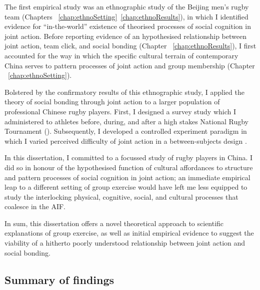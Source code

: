 The first empirical study was an ethnographic study of the Beijing men's rugby team (Chapters ~\ref{chap:ethnoSetting}\nobreakdash~\ref{chap:ethnoResults}), in which I identified evidence for ``in-the-world'' existence of
theorised processes of social cognition in joint action.  Before reporting evidence of an hypothesised relationship between joint action, team click, and social bonding (Chapter ~\ref{chap:ethnoResults}), I first accounted for the way in which the specific cultural terrain of contemporary China serves to pattern processes of joint action and group membership (Chapter ~\ref{chap:ethnoSetting}).

Bolstered by the confirmatory results of this ethnographic study, I applied the theory of social bonding through joint action to a larger population of professional Chinese rugby players.  First, I designed a survey study which I administered to athletes before, during, and after a high stakes National Rugby Tournament (\citep{chap:tournamentSurvey}).  Subsequently, I developed a controlled experiment paradigm in which I varied perceived difficulty of joint action in a between-subjects design \citep{chap:trainingExperiment}.

In this dissertation, I committed to a focussed study of rugby players in China. I did so in honour of the hypothesised function of cultural affordances to structure and pattern processes of social cognition in joint action; an immediate empirical leap to a different setting of group exercise would have left me less equipped to study the interlocking physical, cognitive, social, and cultural processes that coalesce in the AIF.

In sum, this dissertation offers a novel theoretical approach to scientific explanations of group exercise, as well as initial empirical evidence to suggest the viability of a hitherto poorly understood relationship between joint action and social bonding.

\subsection{Summary of findings}


